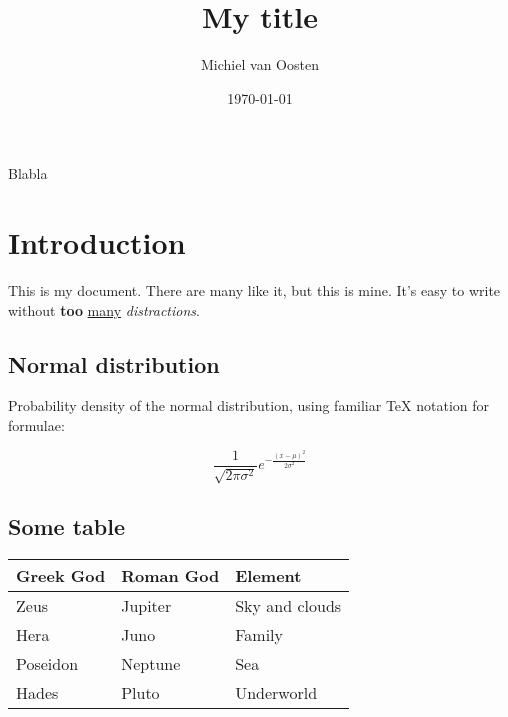 \documentclass[11pt,a4paper]{article}
\title{}
\title{My title}
\author{Michiel van Oosten}
\date{\today}
\begin{document}
\maketitle


Blabla
\section*{Introduction}
\label{sec-1}

  
  This is my document. There are many like it, but this is mine. It's easy to
  write without \textbf{too} \underline{many} \emph{distractions}.
  
\subsection*{Normal distribution}
\label{sec-1-1}


   Probability density of the normal distribution, using familiar \TeX{} notation
   for formulae:
 
   $$\frac{1}{\sqrt{2\pi\sigma^2}}e^{ -\frac{(x-\mu)^2}{2\sigma^2} }$$
\subsection*{Some table}
\label{sec-1-2}



\begin{center}
\begin{tabular}{lll}
 \textbf{Greek God}  &  \textbf{Roman God}  &  \textbf{Element}  \\
\hline
 Zeus                &  Jupiter             &  Sky and clouds    \\
 Hera                &  Juno                &  Family            \\
 Poseidon            &  Neptune             &  Sea               \\
 Hades               &  Pluto               &  Underworld        \\
\end{tabular}
\end{center}
\end{document}
